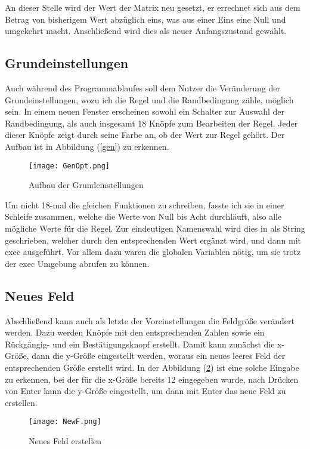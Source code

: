 \documentclass{scrartcl}
\begin{document}
An dieser Stelle wird der Wert der Matrix neu gesetzt, er errechnet sich aus dem Betrag von bisherigem Wert abzüglich eins, was aus einer Eins eine Null und umgekehrt macht.
Anschließend wird dies als neuer Anfangszustand gewählt.

\subsection{Grundeinstellungen}
Auch während des Programmablaufes soll dem Nutzer die Veränderung der Grundeinstellungen, wozu ich die Regel und die Randbedingung zähle, möglich sein. In einem neuen Fenster erscheinen sowohl ein Schalter zur Auswahl der Randbedingung, als auch insgesamt 18 Knöpfe zum Bearbeiten der Regel. Jeder dieser Knöpfe zeigt durch seine Farbe an, ob der Wert zur Regel gehört. Der Aufbau ist in Abbildung (\ref{gen}) zu erkennen.

\begin{figure}[!h]
	\begin{center}
		\texttt{[image: GenOpt.png]}
		\caption{Aufbau der Grundeinstellungen}
		\label{blink1}
	\end{center}
\end{figure}

Um nicht 18-mal die gleichen Funktionen zu schreiben, fasste ich sie in einer Schleife zusammen, welche die Werte von Null bis Acht durchläuft, also alle mögliche Werte für die Regel. Zur eindeutigen Namenswahl wird dies in als String geschrieben, welcher durch den entsprechenden Wert ergänzt wird, und dann mit exec ausgeführt. Vor allem dazu waren die globalen Variablen nötig, um sie trotz der exec Umgebung abrufen zu können.
\subsection{Neues Feld}
Abschließend kann auch als letzte der Voreinstellungen die Feldgröße verändert werden. Dazu werden Knöpfe mit den entsprechenden Zahlen sowie ein Rückgängig- und ein Bestätigungsknopf erstellt. Damit kann zunächst die x-Größe, dann die y-Größe eingestellt werden, woraus ein neues leeres Feld der entsprechenden Größe erstellt wird. In der Abbildung (\ref{NewF}) ist eine solche Eingabe zu erkennen, bei der für die x-Größe bereits 12 eingegeben wurde, nach Drücken von Enter kann die y-Größe eingestellt, um dann mit Enter das neue Feld zu erstellen.
\begin{figure}[!h]
	\begin{center}
		\texttt{[image: NewF.png]}
		\caption{Neues Feld erstellen}
		\label{NewF}
	\end{center}
\end{figure}
\end{document}
